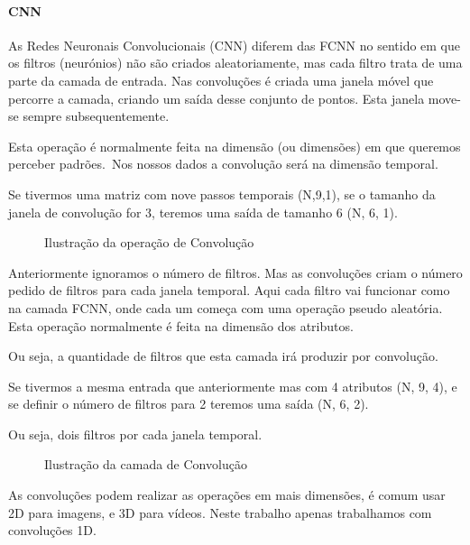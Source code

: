 \paragraph{CNN\label{se:cnn_sec}}
\text{ }  \par

As Redes Neuronais Convolucionais (\gls{CNN}) diferem das \gls{FCNN} no sentido em que os filtros (neurónios) não são criados aleatoriamente, mas cada filtro trata de uma parte da camada de entrada. Nas convoluções é criada uma janela móvel que percorre a camada, criando um saída desse conjunto de pontos. Esta janela move-se sempre subsequentemente.\par
Esta operação é normalmente feita na dimensão (ou dimensões) em que queremos perceber padrões.\
Nos nossos dados a convolução será na dimensão temporal.\par
Se tivermos uma matriz com nove passos temporais (N,9,1), se o tamanho da janela de convolução for 3, teremos uma saída de tamanho 6 (N, 6, 1).\par
\begin{figure}[H]
	\centering
	\resizebox{0.7\linewidth}{!}{}
	\caption{Ilustração da operação de Convolução}
	\label{fig:conv_layer1D}
\end{figure}

Anteriormente ignoramos o número de filtros. Mas as convoluções criam o número pedido de filtros para cada janela temporal. Aqui cada filtro vai funcionar como na camada \gls{FCNN}, onde cada um começa com uma operação pseudo aleatória. Esta operação normalmente é feita na dimensão dos atributos.\par
Ou seja, a quantidade de filtros que esta camada irá produzir por convolução.\par
Se tivermos a mesma entrada que anteriormente mas com 4 atributos (N, 9, 4), e se definir o número de filtros para 2 teremos uma saída (N, 6, 2).\par
Ou seja, dois filtros por cada janela temporal.\par


\begin{figure}[H]
	\centering
	\resizebox{0.7\linewidth}{!}{}
	\caption{Ilustração da camada de Convolução}
	\label{fig:conv_layer}
\end{figure}

As convoluções podem realizar as operações em mais dimensões, é comum usar 2D para imagens, e 3D para vídeos. Neste trabalho apenas trabalhamos com convoluções 1D.\par

